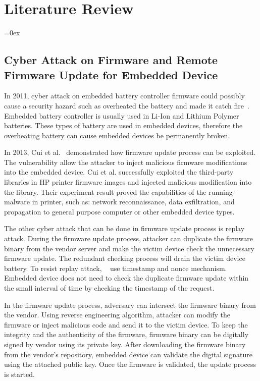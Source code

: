 \begin{flushright}
	
\end{flushright}\chapter{Literature Review}
\label{cha:2_literature}
\parskip=0ex

\section{Cyber Attack on Firmware and Remote Firmware Update for Embedded Device}
\label{sec:1_issues}

In 2011, cyber attack on embedded battery controller firmware could possibly cause a security hazard such as overheated the battery and made it catch fire~\cite{batteryfirmware}. Embedded battery controller is usually used in Li-Ion and Lithium Polymer batteries. These types of battery are used in embedded devices, therefore the overheating battery can cause embedded devices be permanently broken.

\sloppy In 2013, Cui et al.~\cite{conf/ndss/2013} demonstrated how firmware update process can be exploited. The vulnerability allow the attacker to inject malicious firmware modifications into the embedded device. Cui et al. successfully exploited the third-party libraries in HP printer firmware images and injected malicious modification into the library. Their experiment result proved the capabilities of the running-malware in printer, such as: network reconnaissance, data exfiltration, and propagation to general purpose computer or other embedded device types. 

The other cyber attack that can be done in firmware update process is replay attack. During the firmware update process, attacker can duplicate the firmware binary from the vendor server and make the victim device check the unnecessary firmware update. The redundant checking process will drain the victim device battery. To resist replay attack, ~\cite{iotsecurity} use timestamp and nonce mechanism. Embedded device does not need to check the duplicate firmware update within the small interval of time by checking the timestamp of the request.

In the firmware update process, adversary can intersect the firmware binary from the vendor. Using reverse engineering algorithm, attacker can modify the firmware or inject malicious code and send it to the victim device. To keep the integrity and the authenticity of the firmware, firmware binary can be digitally signed by vendor using its private key. After downloading the firmware binary from the vendor's repository, embedded device can validate the digital signature using the attached public key. Once the firmware is validated, the update process is started.

